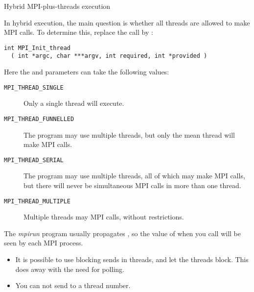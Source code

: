 
 {Hybrid MPI-plus-threads execution}

In hybrid execution, the main question is whether all threads
are allowed to make MPI calls. To determine this,
replace the  call by
:
\begin{verbatim}
int MPI_Init_thread
  ( int *argc, char ***argv, int required, int *provided )
\end{verbatim}
Here the  and  parameters can take the following
values:
\begin{description}
\item[\texttt{MPI\_THREAD\_SINGLE}] Only a
  single thread will execute.
\item[\texttt{MPI\_THREAD\_FUNNELLED}]
  The program may use multiple threads, but only the mean thread will
  make MPI calls.
\item[\texttt{MPI\_THREAD\_SERIAL}] The
  program may use multiple threads, all of which may make MPI calls,
  but there will never be simultaneous MPI calls in more than one
  thread.
\item[\texttt{MPI\_THREAD\_MULTIPLE}]Multiple
  threads may MPI calls, without restrictions.
\end{description}

The \emph{mpirun}
program usually propagates ,
so the value of  when you call 
will be seen by each MPI process.

\begin{itemize}
\item It is possible to use blocking sends in threads, and let the
  threads block. This does away with the need for polling.
\item You can not send to a thread number.
\end{itemize}
